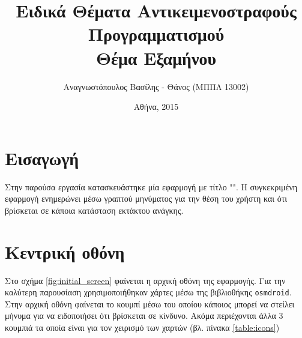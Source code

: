 \documentclass{assignment}
\title{Ειδικά Θέματα Αντικειμενοστραφούς Προγραμματισμού \\ Θέμα Εξαμήνου}
\date{Αθήνα, 2015}
\author{Αναγνωστόπουλος Βασίλης - Θάνος (ΜΠΠΛ 13002)}
\begin{document}
\maketitle

\setcounter{page}{1} 

\pagestyle{plain}
\tableofcontents
\newpage

\setcounter{page}{1} 

\section{Εισαγωγή}

Στην παρούσα εργασία κατασκευάστηκε μία  εφαρμογή με τίτλο "". Η συγκεκριμένη εφαρμογή ενημερώνει μέσω γραπτού μηνύματος για την θέση του χρήστη και ότι βρίσκεται σε κάποια κατάσταση εκτάκτου ανάγκης.

\section{Κεντρική οθόνη}

Στο σχήμα \ref{fig:initial_screen} φαίνεται η αρχική οθόνη της εφαρμογής. Για την καλύτερη παρουσίαση χρησιμοποιήθηκαν χάρτες μέσω της βιβλιοθήκης \texttt{osmdroid}. Στην αρχική οθόνη φαίνεται το κουμπί μέσω του οποίου κάποιος μπορεί να στείλει μήνυμα για να ειδοποιήσει ότι βρίσκεται σε κίνδυνο. Ακόμα περιέχονται άλλα 3 κουμπιά τα οποία είναι για τον χειρισμό των χαρτών (βλ. πίνακα \ref{table:icons})
\end{document}
